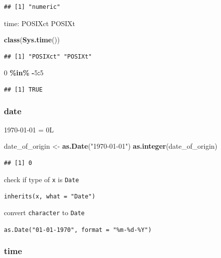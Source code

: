 \documentclass[
]{book}
\newenvironment{Shaded}{\begin{snugshade}}{\end{snugshade}}
\newcommand{\DecValTok}[1]{\textcolor[rgb]{0.00,0.00,0.81}{#1}}
\newcommand{\FunctionTok}[1]{\textcolor[rgb]{0.13,0.29,0.53}{\textbf{#1}}}
\newcommand{\NormalTok}[1]{#1}
\newcommand{\OtherTok}[1]{\textcolor[rgb]{0.56,0.35,0.01}{#1}}
\newcommand{\SpecialCharTok}[1]{\textcolor[rgb]{0.81,0.36,0.00}{\textbf{#1}}}
\newcommand{\StringTok}[1]{\textcolor[rgb]{0.31,0.60,0.02}{#1}}
\theoremstyle{definition}
\theoremstyle{definition}
\theoremstyle{definition}
\theoremstyle{definition}
\theoremstyle{remark}
\begin{document}
\begin{verbatim}
## [1] "numeric"
\end{verbatim}

time: POSIXct POSIXt

\begin{Shaded}
\begin{Highlighting}[]
\FunctionTok{class}\NormalTok{(}\FunctionTok{Sys.time}\NormalTok{())}
\end{Highlighting}
\end{Shaded}

\begin{verbatim}
## [1] "POSIXct" "POSIXt"
\end{verbatim}

\begin{Shaded}
\begin{Highlighting}[]
\DecValTok{0} \SpecialCharTok{\%in\%} \SpecialCharTok{{-}}\DecValTok{5}\SpecialCharTok{:}\DecValTok{5}
\end{Highlighting}
\end{Shaded}

\begin{verbatim}
## [1] TRUE
\end{verbatim}

\subsubsection{date}\label{date}

1970-01-01 = 0L

\begin{Shaded}
\begin{Highlighting}[]
\NormalTok{date\_of\_origin }\OtherTok{\textless{}{-}} \FunctionTok{as.Date}\NormalTok{(}\StringTok{"1970{-}01{-}01"}\NormalTok{)}
\FunctionTok{as.integer}\NormalTok{(date\_of\_origin)}
\end{Highlighting}
\end{Shaded}

\begin{verbatim}
## [1] 0
\end{verbatim}

check if type of \texttt{x} is \texttt{Date}

\texttt{inherits(x,\ what\ =\ "Date")}

convert \texttt{character} to \texttt{Date}

\texttt{as.Date("01-01-1970",\ format\ =\ "\%m-\%d-\%Y")}

\subsubsection{time}\label{time}
\end{document}
